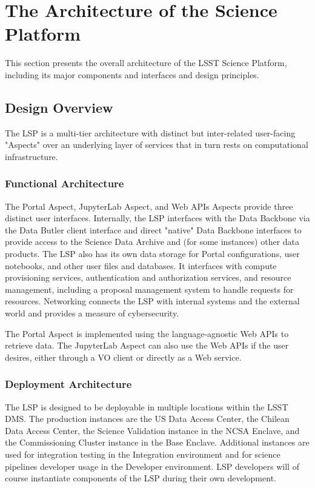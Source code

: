 \section{The Architecture of the Science Platform}\label{architecture}

This section presents the overall architecture of the LSST Science Platform,
including its major components and interfaces and design principles.

\subsection{Design Overview}\label{design-overview}

The LSP is a multi-tier architecture with distinct but inter-related
user-facing "Aspects" over an underlying layer of services that in turn
rests on computational infrastructure.

\subsubsection{Functional Architecture}\label{functional-architecture}

The Portal Aspect, JupyterLab Aspect, and Web APIs Aspects provide three
distinct user interfaces.  Internally, the LSP interfaces with the Data
Backbone via the Data Butler client interface and direct "native" Data Backbone
interfaces to provide access to the Science Data Archive and (for some
instances) other data products.  The LSP also has its own data storage for
Portal configurations, user notebooks, and other user files and databases.  It
interfaces with compute provisioning services, authentication and authorization
services, and resource management, including a proposal management system to
handle requests for resources.  Networking connects the LSP with internal
systems and the external world and provides a measure of cybersecurity.

The Portal Aspect is implemented using the language-agnostic Web APIs to
retrieve data.  The JupyterLab Aspect can also use the Web APIs if the user
desires, either through a VO client or directly as a Web service.

\subsubsection{Deployment Architecture}\label{deployment-architecture}

The LSP is designed to be deployable in multiple locations within the LSST DMS.
The production instances are the US Data Access Center, the Chilean Data Access
Center, the Science Validation instance in the NCSA Enclave, and the
Commissioning Cluster instance in the Base Enclave.  Additional instances are
used for integration testing in the Integration environment and for science
pipelines developer usage in the Developer environment.  LSP developers will
of course instantiate components of the LSP during their own development.

